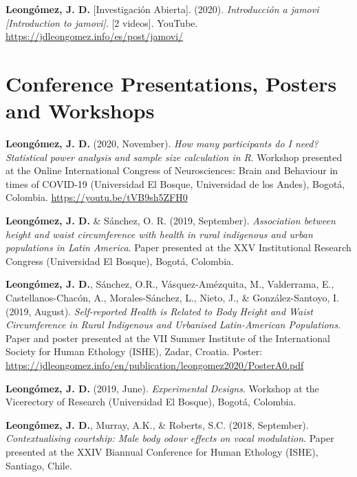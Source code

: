 \documentclass[11pt, a4paper]{awesome-cv}
\begin{document}
\leavevmode{}%
\textbf{Leongómez, J. D.} {[}Investigación Abierta{]}. (2020).
\emph{{Introducción a jamovi {[}Introduction to jamovi{]}}}. {[}2
videos{]}. YouTube. \url{https://jdleongomez.info/es/post/jamovi/}

\endgroup

\hypertarget{conference-presentations-posters-and-workshops}{%
\section{Conference Presentations, Posters and
Workshops}\label{conference-presentations-posters-and-workshops}}

\begingroup
\setlength{\parindent}{-0.5in}
\setlength{\leftskip}{0.5in}

\textbf{Leongómez, J. D.} (2020, November). \emph{How many participants
do I need? Statistical power analysis and sample size calculation in R}.
Workshop presented at the Online International Congress of
Neurosciences: Brain and Behaviour in times of COVID-19 (Universidad El
Bosque, Universidad de los Andes), Bogotá, Colombia.
\url{https://youtu.be/tVB9sh5ZFH0}

\textbf{Leongómez, J. D.} \& Sánchez, O. R. (2019, September).
\emph{Association between height and waist circumference with health in
rural indigenous and urban populations in Latin America}. Paper
presented at the XXV Institutional Research Congress (Universidad El
Bosque), Bogotá, Colombia.

\textbf{Leongómez, J. D.}, Sánchez, O.R., Vásquez-Amézquita, M.,
Valderrama, E., Castellanos-Chacón, A., Morales-Sánchez, L., Nieto, J.,
\& González-Santoyo, I. (2019, August). \emph{Self-reported Health is
Related to Body Height and Waist Circumference in Rural Indigenous and
Urbanised Latin-American Populations}. Paper and poster presented at the
VII Summer Institute of the International Society for Human Ethology
(ISHE), Zadar, Croatia. Poster:
\url{https://jdleongomez.info/en/publication/leongomez2020/PosterA0.pdf}

\textbf{Leongómez, J. D.} (2019, June). \emph{Experimental Designs}.
Workshop at the Vicerectory of Research (Universidad El Bosque), Bogotá,
Colombia.

\textbf{Leongómez, J. D.}, Murray, A.K., \& Roberts, S.C. (2018,
September). \emph{Contextualising courtship: Male body odour effects on
vocal modulation}. Paper presented at the XXIV Biannual Conference for
Human Ethology (ISHE), Santiago, Chile.
\end{document}
